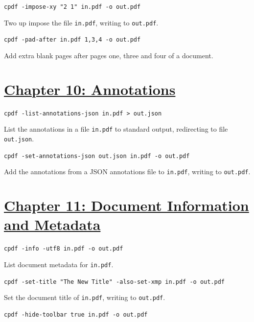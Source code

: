 \documentclass{book}
\begin{document}
\begin{framed}\noindent\texttt{cpdf -impose-xy "2 1" in.pdf -o out.pdf}\end{framed}

\noindent Two up impose the file \texttt{in.pdf}, writing to \texttt{out.pdf}.

\begin{framed}\noindent\texttt{cpdf -pad-after in.pdf 1,3,4 -o out.pdf}\end{framed}

\noindent Add extra blank pages after pages one, three and four of a document.

\section*{\hyperref[chap:10]{Chapter 10: Annotations}}

\begin{framed}\noindent\texttt{cpdf -list-annotations-json in.pdf > out.json}\end{framed}

\noindent List the annotations in a file \texttt{in.pdf} to standard output, redirecting to file \texttt{out.json}.

\begin{framed}\noindent\texttt{cpdf -set-annotations-json out.json in.pdf -o out.pdf}\end{framed}

\noindent Add the annotations from a JSON annotations file to \texttt{in.pdf}, writing to \texttt{out.pdf}.

\section*{\hyperref[chap:11]{Chapter 11: Document Information and Metadata}}

\begin{framed}\noindent\texttt{cpdf -info -utf8 in.pdf -o out.pdf}\end{framed}

\noindent List document metadata for  \texttt{in.pdf}.

\begin{framed}\noindent\texttt{cpdf -set-title "The New Title" -also-set-xmp in.pdf -o out.pdf}\end{framed}

\noindent Set the document title of \texttt{in.pdf}, writing to \texttt{out.pdf}.

\begin{framed}\noindent\texttt{cpdf -hide-toolbar true in.pdf -o out.pdf}\end{framed}
\end{document}
